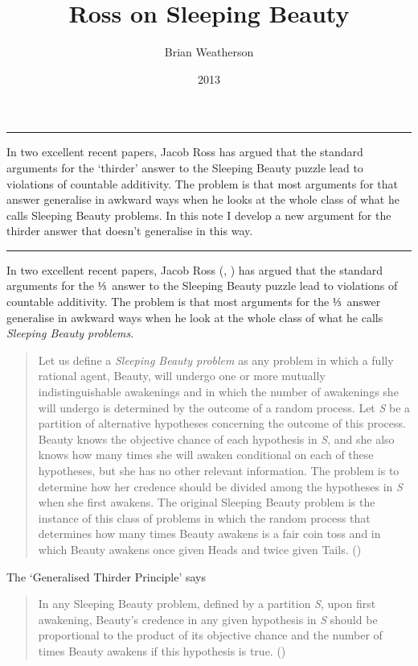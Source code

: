 \documentclass[
  10pt,
  letterpaper,
  DIV=11,
  numbers=noendperiod,
  twoside]{scrartcl}
\title{Ross on Sleeping Beauty}
\author{Brian Weatherson}
\date{2013}
\renewenvironment{abstract}
 {\vspace{-1.25cm}
 \quotation\small\noindent\rule{\linewidth}{.5pt}\par\smallskip
 \noindent }
 {\par\noindent\rule{\linewidth}{.5pt}\endquotation}
\begin{document}
\maketitle
\begin{abstract}
In two excellent recent papers, Jacob Ross has argued that the standard
arguments for the `thirder' answer to the Sleeping Beauty puzzle lead to
violations of countable additivity. The problem is that most arguments
for that answer generalise in awkward ways when he looks at the whole
class of what he calls Sleeping Beauty problems. In this note I develop
a new argument for the thirder answer that doesn't generalise in this
way.
\end{abstract}

In two excellent recent papers, Jacob Ross
(, ) has
argued that the standard arguments for the ⅓~answer to the Sleeping
Beauty puzzle lead to violations of countable additivity. The problem is
that most arguments for the ⅓~answer generalise in awkward ways when he
look at the whole class of what he calls \emph{Sleeping Beauty
problems}.

\begin{quote}
Let us define a \emph{Sleeping Beauty problem} as any problem in which a
fully rational agent, Beauty, will undergo one or more mutually
indistinguishable awakenings and in which the number of awakenings she
will undergo is determined by the outcome of a random process. Let
\emph{S} be a partition of alternative hypotheses concerning the outcome
of this process. Beauty knows the objective chance of each hypothesis in
\emph{S}, and she also knows how many times she will awaken conditional
on each of these hypotheses, but she has no other relevant information.
The problem is to determine how her credence should be divided among the
hypotheses in \emph{S} when she first awakens. The original Sleeping
Beauty problem is the instance of this class of problems in which the
random process that determines how many times Beauty awakens is a fair
coin toss and in which Beauty awakens once given Heads and twice given
Tails. ()
\end{quote}

The `Generalised Thirder Principle' says

\begin{quote}
In any Sleeping Beauty problem, defined by a partition \emph{S}, upon
first awakening, Beauty's credence in any given hypothesis in \emph{S}
should be proportional to the product of its objective chance and the
number of times Beauty awakens if this hypothesis is true.
()
\end{quote}
\end{document}

